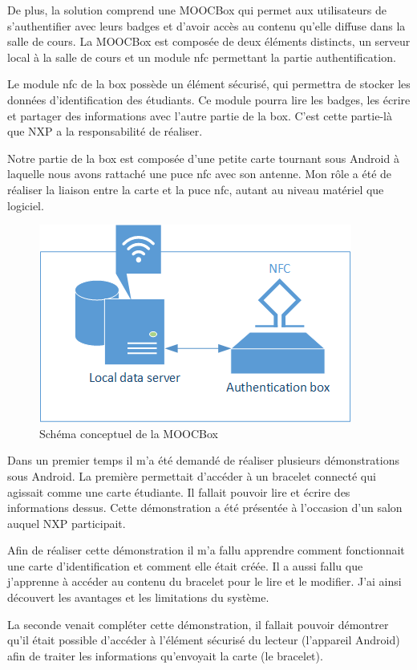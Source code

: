 \documentclass[french,12pt,a4paper,titlepage,openright,openbib]{report}
\begin{document}
De plus, la solution comprend une MOOCBox qui permet aux utilisateurs de s'authentifier avec leurs badges et d'avoir accès au contenu qu'elle diffuse dans la salle de cours.
La MOOCBox est composée de deux éléments distincts, un serveur local à la salle de cours et un module \gls{nfc} permettant la partie authentification.

Le module \gls{nfc} de la box possède un élément sécurisé, qui permettra de stocker les données d'identification des étudiants. Ce module pourra lire les badges, les écrire et partager des informations avec l'autre partie de la box. C'est cette partie-là que NXP a la responsabilité de réaliser.

Notre partie de la box est composée d'une petite carte tournant sous Android à laquelle nous avons rattaché une puce \gls{nfc} avec son antenne. Mon rôle a été de réaliser la liaison entre la carte et la puce \gls{nfc}, autant au niveau matériel que logiciel.
\par
\begin{figure}
	\center
	\includegraphics[]{moocbox_mooctab}
	\caption{Schéma conceptuel de la MOOCBox}
\end{figure}
Dans un premier temps il m'a été demandé de réaliser plusieurs démonstrations sous Android.
La première permettait d'accéder à un bracelet connecté qui agissait comme une carte étudiante. Il fallait pouvoir lire et écrire des informations dessus. Cette démonstration a été présentée à l'occasion d'un salon auquel NXP participait.

Afin de réaliser cette démonstration il m'a fallu apprendre comment fonctionnait une carte d'identification et comment elle était créée. Il a aussi fallu que j'apprenne à accéder au contenu du bracelet pour le lire et le modifier. J'ai ainsi découvert les avantages et les limitations du système.

La seconde venait compléter cette démonstration, il fallait pouvoir démontrer qu'il était possible d'accéder à l'élément sécurisé du lecteur (l'appareil Android) afin de traiter les informations qu'envoyait la carte (le bracelet).
\end{document}
